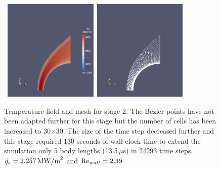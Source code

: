 \begin{figure}[htbp]
\begin{center}
\mbox{
\includegraphics[width=0.4\textwidth]{../2D/sphere-heat-transfer/sphere2-T-field.png}
\includegraphics[width=0.4\textwidth]{../2D/sphere-heat-transfer/sphere2-mesh.png}
}
\end{center}
\caption{Temperature field and mesh for stage 2.
  The Bezier points have not been adapted further for this stage but the number of cells
  has been increased to 30$\times$30.
  The size of the time step decreased further and this stage required 130 seconds of wall-clock time
  to extend the simulation only 5 body lengths (13.5\,$\mu$s) in 24293 time steps.
  $\dot{q}_s=2.257\,{\rm MW/m}^2$ and ${\rm Re}_{wall} =2.39$}
\label{sphere-heat-transfer-stage-2-fig}
\end{figure}

